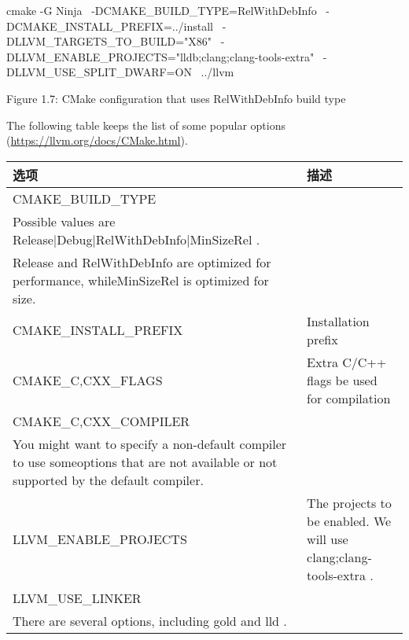 \begin{shell}
cmake -G Ninja \
  -DCMAKE_BUILD_TYPE=RelWithDebInfo \
  -DCMAKE_INSTALL_PREFIX=../install \
  -DLLVM_TARGETS_TO_BUILD="X86" \
  -DLLVM_ENABLE_PROJECTS="lldb;clang;clang-tools-extra" \
  -DLLVM_USE_SPLIT_DWARF=ON \
  ../llvm
\end{shell}

\begin{center}
Figure 1.7: CMake configuration that uses RelWithDebInfo build type
\end{center}

The following table keeps the list of some popular options (\url{https://llvm.org/docs/CMake.html}).


\begin{longtable}{|l|l|}
\hline
\textbf{选项}            & \textbf{描述}                                                       \\ \hline
\endfirsthead
%
\endhead
%
CMAKE\_BUILD\_TYPE &
\begin{tabular}[c]{@{}l@{}}Specifies the build configuration.\\ Possible values are Release|Debug|RelWithDebInfo|MinSizeRel .\\ Release and RelWithDebInfo are optimized for performance, whileMinSizeRel is optimized for size.\end{tabular} \\ \hline
CMAKE\_INSTALL\_PREFIX & Installation prefix                                               \\ \hline
CMAKE\_C,CXX\_FLAGS    & Extra C/C++ flags be used for compilation                         \\ \hline
CMAKE\_C,CXX\_COMPILER &
\begin{tabular}[c]{@{}l@{}}C/C++ compiler be used for compilation.\\ You might want to specify a non-default compiler to use someoptions that are not available or not supported by the default compiler.\end{tabular} \\ \hline
LLVM\_ENABLE\_PROJECTS & The projects to be enabled. We will use clang;clang-tools-extra . \\ \hline
LLVM\_USE\_LINKER &
\begin{tabular}[c]{@{}l@{}}Specifies the linker to be used. \\ There are several options, including gold and lld .\end{tabular} \\ \hline
\end{longtable}

